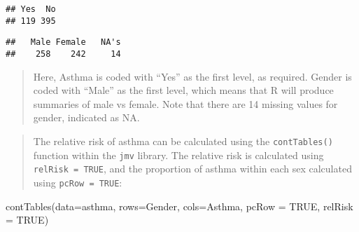 \documentclass[
]{memoir}
\newenvironment{Shaded}{\begin{snugshade}}{\end{snugshade}}
\newcommand{\AttributeTok}[1]{\textcolor[rgb]{0.77,0.63,0.00}{#1}}
\newcommand{\ConstantTok}[1]{\textcolor[rgb]{0.00,0.00,0.00}{#1}}
\newcommand{\FunctionTok}[1]{\textcolor[rgb]{0.00,0.00,0.00}{#1}}
\newcommand{\NormalTok}[1]{#1}
\newcommand{\OtherTok}[1]{\textcolor[rgb]{0.56,0.35,0.01}{#1}}
\newcommand{\SpecialCharTok}[1]{\textcolor[rgb]{0.00,0.00,0.00}{#1}}
\newcommand{\StringTok}[1]{\textcolor[rgb]{0.31,0.60,0.02}{#1}}
\begin{document}
\begin{Shaded}
\end{Shaded}

\begin{verbatim}
## Yes  No 
## 119 395
\end{verbatim}

\begin{Shaded}
\end{Shaded}

\begin{verbatim}
##   Male Female   NA's 
##    258    242     14
\end{verbatim}

\begin{quote}
Here, Asthma is coded with ``Yes'' as the first level, as required. Gender is coded with ``Male'' as the first level, which means that R will produce summaries of male vs female. Note that there are 14 missing values for gender, indicated as NA.
\end{quote}

\begin{quote}
The relative risk of asthma can be calculated using the \texttt{contTables()} function within the \texttt{jmv} library. The relative risk is calculated using \texttt{relRisk\ =\ TRUE}, and the proportion of asthma within each sex calculated using \texttt{pcRow\ =\ TRUE}:
\end{quote}

\begin{Shaded}
\begin{Highlighting}[]
\FunctionTok{contTables}\NormalTok{(}\AttributeTok{data=}\NormalTok{asthma, }\AttributeTok{rows=}\NormalTok{Gender, }\AttributeTok{cols=}\NormalTok{Asthma,}
          \AttributeTok{pcRow =} \ConstantTok{TRUE}\NormalTok{, }\AttributeTok{relRisk =} \ConstantTok{TRUE}\NormalTok{)}
\end{Highlighting}
\end{Shaded}
\end{document}
